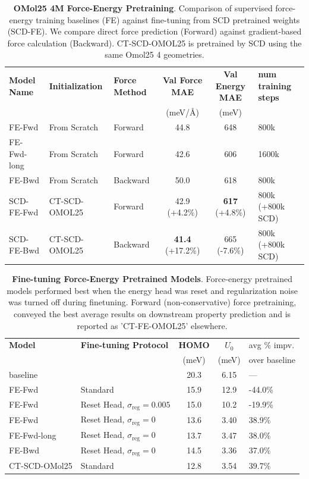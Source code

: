 \begin{table}[h]
\centering
\caption{\textbf{OMol25 4M Force-Energy Pretraining}. Comparison of supervised force-energy training baselines (FE) against fine-tuning from SCD pretrained weights (SCD-FE). We compare direct force prediction (Forward) against gradient-based force calculation (Backward). CT-SCD-OMOL25 is pretrained by SCD using the same Omol25 4 geometries.}
\label{tab:fe_pretrain}
\small
\setlength{\tabcolsep}{5pt}
\begin{tabular}{l l l c cl}
\toprule
\textbf{Model Name} & \textbf{Initialization} & \textbf{Force Method} & \textbf{Val Force MAE} & \textbf{Val Energy MAE}  & \textbf{num training steps}\\
& & & (meV/\AA) & (meV)  &\\
\midrule
FE-Fwd & From Scratch & Forward & 44.8 & 648  &800k\\
FE-Fwd-long & From Scratch & Forward & 42.6 & 606  &1600k\\
FE-Bwd & From Scratch & Backward & 50.0 & 618  &800k\\

\midrule
SCD-FE-Fwd & CT-SCD-OMOL25 & Forward & 42.9 \small(+4.2\%) & \textbf{617} \small(+4.8\%)  &800k (+800k SCD)\\
SCD-FE-Bwd & CT-SCD-OMOL25 & Backward & \textbf{41.4} \small(+17.2\%) & 665 \small(-7.6\%) &800k (+800k SCD)\\
\bottomrule
\end{tabular}
\end{table}


\begin{table}[h]
\centering
\caption{\textbf{Fine-tuning Force-Energy Pretrained Models}. Force-energy pretrained models performed best when the energy head was reset and regularization noise was turned off during finetuning. Forward (non-conservative) force pretraining, conveyed the best average results on downstream property prediction and is reported as 'CT-FE-OMOL25' elsewhere.
}
\label{tab:fe_finetune}
\small
\setlength{\tabcolsep}{5pt}
\begin{tabular}{l l c cl}
\toprule
\textbf{Model} & \textbf{Fine-tuning Protocol} & \textbf{HOMO} & \textbf{$U_0$}  &avg \% impv. \\
& & (meV) & (meV)  &over baseline\\
\midrule
 baseline& & 20.3& 6.15&---\\
\midrule
FE-Fwd & Standard & 15.9 & 12.9  &-44.0\%\\
FE-Fwd & Reset Head, $\sigma_{\text{reg}}=0.005$ & 15.0 & 10.2  &-19.9\%\\
FE-Fwd & Reset Head, $\sigma_{\text{reg}}=0$ & 13.6 & 3.40  &38.9\%\\
FE-Fwd-long & Reset Head, $\sigma_{\text{reg}}=0$ & 13.7 & 3.47  &38.0\%\\
FE-Bwd & Reset Head, $\sigma_{\text{reg}}=0$ & 14.5 & 3.36  &37.0\%\\
\midrule
CT-SCD-OMol25 & Standard & 12.8 & 3.54  & 39.7\%\\
\bottomrule
\end{tabular}
\end{table}


